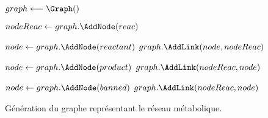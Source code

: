 \IncMargin{1em}
\begin{algorithm}

  
  $graph \longleftarrow \Graph()$\;
  {
    \BlankLine
    $nodeReac \leftarrow graph.\AddNode(reac)$\;

    \BlankLine
    {
      $node \leftarrow graph.\AddNode(reactant)$\;
      $graph.\AddLink(node, nodeReac)$\;
    }

    \BlankLine
    {
      $node \leftarrow graph.\AddNode(product)$\;
      $graph.\AddLink(nodeReac, node)$\;
    }

    \BlankLine
    {
      $node \leftarrow graph.\AddNode(banned)$\;
      $graph.\AddLink(nodeReac, node)$\;
    }
  }

  \caption{Génération du graphe représentant le réseau métabolique.}
  \label{graph_gen}
\end{algorithm}\DecMargin{1em}

